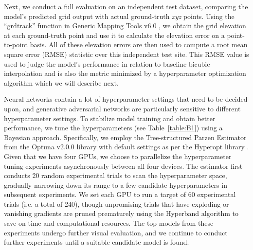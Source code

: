 \documentclass[tc, noline]{copernicus}
\begin{document}
Next, we conduct a full evaluation on an independent test dataset, comparing the model's predicted grid output with actual ground-truth \textit{xyz} points. Using the ``grdtrack'' function in Generic Mapping Tools v6.0 \citep{WesselGenericMappingTools2019}, we obtain the grid elevation at each
ground-truth point and use it to calculate the elevation error on a point-to-point basis. All of these elevation errors are then used to compute a root
mean square error (RMSE) statistic over this independent test site. This RMSE value is used to judge the model's performance in relation to baseline
bicubic interpolation and is also the metric minimized by a hyperparameter optimization algorithm which we will describe next.


Neural networks contain a lot of hyperparameter settings that need to be decided upon, and generative adversarial networks are particularly sensitive
to different hyperparameter settings. To stabilize model training and obtain better performance, we tune the hyperparameters (see
Table~\ref{table:B1}) using a Bayesian approach. Specifically, we employ the Tree-structured Parzen Estimator
\citep{BergstraAlgorithmsHyperparameterOptimization2011} from the Optuna v2.0.0 \citep{AkibaOptunaNextgenerationHyperparameter2019} library with
default settings as per the Hyperopt library \citep{BergstraHyperoptPythonlibrary2015}. Given that we have four GPUs, we choose to parallelize the
hyperparameter tuning experiments asynchronously between all four devices. The estimator first conducts 20 random experimental trials to scan the
hyperparameter space, gradually narrowing down its range to a few candidate hyperparameters in subsequent experiments. We set each GPU to run a target of 60
experimental trials (i.e. a total of 240), though unpromising trials that have exploding or vanishing gradients are pruned prematurely using the
Hyperband algorithm \citep{LiHyperbandNovelBanditBased2018} to save on time and computational resources. The top models from these experiments undergo
further visual evaluation, and we continue to conduct further experiments until a suitable candidate model is found.


\hack{\clearpage}



\end{document}
